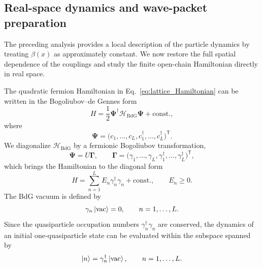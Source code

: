 \documentclass[reprint,amsmath,amssymb,aps,showkeys,superscriptaddress]{revtex4-2}
\begin{document}
\subsection{Real-space dynamics and wave-packet preparation}
\label{subsec:real_space}

The preceding analysis provides a local description of the particle
dynamics by treating $\beta(x)$ as approximately constant. We now
restore the full spatial dependence of the couplings and study the
finite open-chain Hamiltonian directly in real space.

The quadratic fermion Hamiltonian in
Eq.~\eqref{eq:lattice_Hamiltonian} can be written in the
Bogoliubov--de Gennes form
\begin{equation}
  H
  =
  \frac{1}{2}
  \boldsymbol{\Psi}^{\dagger}
  \mathcal{H}_{\mathrm{BdG}}
  \boldsymbol{\Psi}
  +\mathrm{const.},
  \label{eq:real_space_BdG}
\end{equation}
where
\begin{equation}
  \boldsymbol{\Psi}
  =
  \bigl(
    c_1,\ldots,c_L,
    c_1^\dagger,\ldots,c_L^\dagger
  \bigr)^{\mathsf T}.
  \label{eq:real_space_Nambu}
\end{equation}
We diagonalize $\mathcal{H}_{\mathrm{BdG}}$ by a fermionic
Bogoliubov transformation,
\begin{equation}
  \boldsymbol{\Psi}
  =
  U\boldsymbol{\Gamma},
  \qquad
  \boldsymbol{\Gamma}
  =
  \bigl(
    \gamma_1,\ldots,\gamma_L,
    \gamma_1^\dagger,\ldots,\gamma_L^\dagger
  \bigr)^{\mathsf T},
  \label{eq:Bogoliubov_transformation}
\end{equation}
which brings the Hamiltonian to the diagonal form
\begin{equation}
  H
  =
  \sum_{n=1}^{L}
  E_n\gamma_n^\dagger\gamma_n
  +\mathrm{const.},
  \qquad
  E_n\geq0.
  \label{eq:diagonal_Hamiltonian}
\end{equation}
The BdG vacuum is defined by
\begin{equation}
  \gamma_n\ket{\mathrm{vac}}=0,
  \qquad
  n=1,\ldots,L.
  \label{eq:BdG_vacuum}
\end{equation}
Since the quasiparticle occupation numbers
$\gamma_n^\dagger\gamma_n$ are conserved, the dynamics of an
initial one-quasiparticle state can be evaluated within the subspace
spanned by
\begin{equation}
  \ket{n}
  =
  \gamma_n^\dagger\ket{\mathrm{vac}},
  \qquad
  n=1,\ldots,L.
  \label{eq:one_quasiparticle_basis}
\end{equation}
\end{document}
